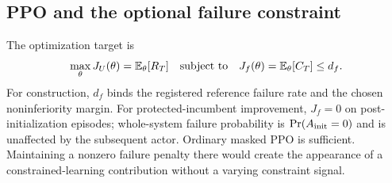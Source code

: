 \subsection{PPO and the optional failure constraint}

The optimization target is
\begin{equation}
 \max_\theta J_U(\theta)=\mathbb{E}_\theta[R_T]
 \quad\text{subject to}\quad
 J_f(\theta)=\mathbb{E}_\theta[C_T]\le d_f.
 \label{eq:rl-cmdp}
\end{equation}
For construction, \(d_f\) binds the registered reference failure rate and the chosen
noninferiority margin. For protected-incumbent improvement, \(J_f=0\) on post-initialization episodes; whole-system failure probability is $\Pr(A_{\rm init}=0)$ and is unaffected by the subsequent actor. Ordinary
masked PPO is sufficient. Maintaining a nonzero failure penalty there would create the appearance
of a constrained-learning contribution without a varying constraint signal.

